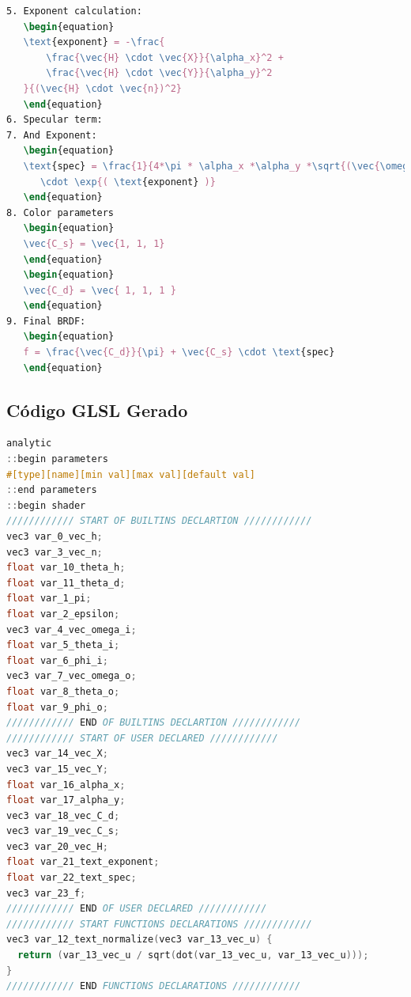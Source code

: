\begin{codigo}[H]
    \caption{\small Código fonte da BRDF do experimento Ward (parte 2 de 2).}
    \label{cod-ward-eqlang-pt-2}
\begin{lstlisting}[language=tex, frame=none, inputencoding=utf8]
5. Exponent calculation:
   \begin{equation}
   \text{exponent} = -\frac{
       \frac{\vec{H} \cdot \vec{X}}{\alpha_x}^2 +
       \frac{\vec{H} \cdot \vec{Y}}{\alpha_y}^2
   }{(\vec{H} \cdot \vec{n})^2}
   \end{equation}
6. Specular term:
7. And Exponent:
   \begin{equation}
   \text{spec} = \frac{1}{4*\pi * \alpha_x *\alpha_y *\sqrt{(\vec{\omega_i} \cdot \vec{n}) * (\vec{\omega_o} \cdot \vec{n})}}
      \cdot \exp{( \text{exponent} )}
   \end{equation}
8. Color parameters
   \begin{equation}
   \vec{C_s} = \vec{1, 1, 1}
   \end{equation}
   \begin{equation}
   \vec{C_d} = \vec{ 1, 1, 1 }
   \end{equation}
9. Final BRDF:
   \begin{equation}
   f = \frac{\vec{C_d}}{\pi} + \vec{C_s} \cdot \text{spec}
   \end{equation}
\end{lstlisting}
\end{codigo}

\subsection{Código GLSL Gerado}
\begin{codigo}[H]
    \caption{\small Saída do compilador: código GLSL da BRDF do experimento Ward (parte 1 de 2).}
    \label{cod-ward-glsl-pt-1}
\begin{lstlisting}[language=C, inputencoding=utf8]
analytic
::begin parameters
#[type][name][min val][max val][default val]
::end parameters
::begin shader
//////////// START OF BUILTINS DECLARTION ////////////
vec3 var_0_vec_h;
vec3 var_3_vec_n;
float var_10_theta_h;
float var_11_theta_d;
float var_1_pi;
float var_2_epsilon;
vec3 var_4_vec_omega_i;
float var_5_theta_i;
float var_6_phi_i;
vec3 var_7_vec_omega_o;
float var_8_theta_o;
float var_9_phi_o;
//////////// END OF BUILTINS DECLARTION ////////////
//////////// START OF USER DECLARED ////////////
vec3 var_14_vec_X;
vec3 var_15_vec_Y;
float var_16_alpha_x;
float var_17_alpha_y;
vec3 var_18_vec_C_d;
vec3 var_19_vec_C_s;
vec3 var_20_vec_H;
float var_21_text_exponent;
float var_22_text_spec;
vec3 var_23_f;
//////////// END OF USER DECLARED ////////////
//////////// START FUNCTIONS DECLARATIONS ////////////
vec3 var_12_text_normalize(vec3 var_13_vec_u) {
  return (var_13_vec_u / sqrt(dot(var_13_vec_u, var_13_vec_u)));
}
//////////// END FUNCTIONS DECLARATIONS ////////////
\end{lstlisting}
\end{codigo}

